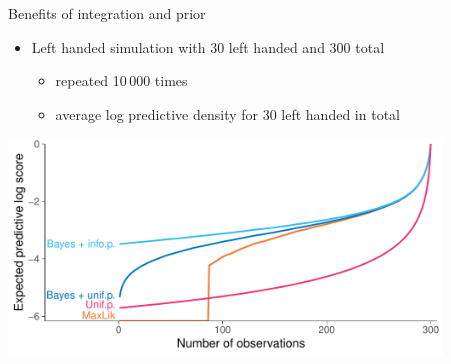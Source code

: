 \documentclass[english,t]{beamer}
\begin{document}
\begin{frame}{Benefits of integration and prior}

  \begin{itemize}
  \item Left handed simulation with 30 left handed and 300 total
    \begin{itemize}
    \item repeated 10\,000 times
    \item average log predictive density for 30 left handed in total
    \end{itemize}
  \end{itemize}
  
  \hspace{-1cm}\includegraphics[width=11.5cm]{figs/lefthand_simulation_logscore.pdf}

\end{frame}


\end{document}
